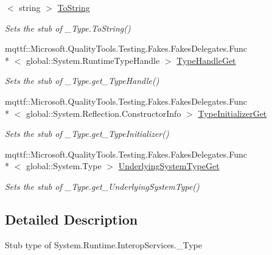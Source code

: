 \begin{DoxyCompactItemize}
$<$ string $>$ \hyperlink{class_system_1_1_runtime_1_1_interop_services_1_1_fakes_1_1_stub___type_af946b2b3d00d9bbbfc4fd991076fde70}{To\-String}
\begin{DoxyCompactList}\small\item\em Sets the stub of \-\_\-\-Type.\-To\-String()\end{DoxyCompactList}\item 
mqttf\-::\-Microsoft.\-Quality\-Tools.\-Testing.\-Fakes.\-Fakes\-Delegates.\-Func\\*
$<$ global\-::\-System.\-Runtime\-Type\-Handle $>$ \hyperlink{class_system_1_1_runtime_1_1_interop_services_1_1_fakes_1_1_stub___type_aa126a3f77824953d9fd601fcf0624ce6}{Type\-Handle\-Get}
\begin{DoxyCompactList}\small\item\em Sets the stub of \-\_\-\-Type.\-get\-\_\-\-Type\-Handle()\end{DoxyCompactList}\item 
mqttf\-::\-Microsoft.\-Quality\-Tools.\-Testing.\-Fakes.\-Fakes\-Delegates.\-Func\\*
$<$ global\-::\-System.\-Reflection.\-Constructor\-Info $>$ \hyperlink{class_system_1_1_runtime_1_1_interop_services_1_1_fakes_1_1_stub___type_a25caed0765fd91d46ca385ff17bd7a32}{Type\-Initializer\-Get}
\begin{DoxyCompactList}\small\item\em Sets the stub of \-\_\-\-Type.\-get\-\_\-\-Type\-Initializer()\end{DoxyCompactList}\item 
mqttf\-::\-Microsoft.\-Quality\-Tools.\-Testing.\-Fakes.\-Fakes\-Delegates.\-Func\\*
$<$ global\-::\-System.\-Type $>$ \hyperlink{class_system_1_1_runtime_1_1_interop_services_1_1_fakes_1_1_stub___type_a2cb02fd06fc980d0ea5a2fe0b29efda8}{Underlying\-System\-Type\-Get}
\begin{DoxyCompactList}\small\item\em Sets the stub of \-\_\-\-Type.\-get\-\_\-\-Underlying\-System\-Type()\end{DoxyCompactList}\end{DoxyCompactItemize}


\subsection{Detailed Description}
Stub type of System.\-Runtime.\-Interop\-Services.\-\_\-\-Type




